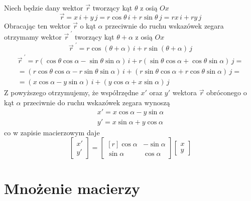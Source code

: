 \documentclass[12pt,a4paper,leqno]{article}
\numberwithin{equation}{section}
\begin{document}
Niech będzie dany wektor $\vec{r}$ tworzący kąt $\theta$ z osią $Ox$
\begin{equation}
\vec{r} = x \, i + y \, j = r \cos \theta \, i + r \sin \theta \, j = r x \, i + r y \, j
\end{equation}
Obracając ten wektor $\vec{r}$ o kąt $\alpha$ przeciwnie do ruchu wskazówek zegara
otrzymamy wektor $\vec{r}^{\,\,'}$ tworzący kąt $\theta + \alpha$ z osią $Ox$
\begin{equation}
\vec{r}^{\,\,'} = r \cos( \theta + \alpha ) \, i + r \sin( \theta + \alpha ) \, j
\end{equation}
\begin{eqnarray}
\vec{r}^{\,\,'} = r (\cos \theta \cos \alpha - \sin \theta \sin \alpha) \, i
+                 r (\sin \theta \cos \alpha + \cos \theta \sin \alpha) \, j         =  \\ \nonumber
=
( r \cos \theta \cos \alpha - r \sin \theta \sin \alpha ) \, i 
+
( r \sin \theta \cos \alpha + r \cos \theta \sin \alpha ) \, j                       =  \\ \nonumber
=
( x \cos \alpha - y \sin \alpha ) \, i 
+
( y \cos \alpha + x \sin \alpha ) \, j 
\end{eqnarray}
Z powyższego otrzymujemy, że współrzędne $x'$ oraz $y'$ wektora $\vec{r}$ obróconego o kąt $\alpha$ przeciwnie 
do ruchu wskazówek zegara wynoszą
\begin{eqnarray}
x' = x \cos \alpha - y \sin \alpha      \\ 
y' = x \sin \alpha + y \cos \alpha
\end{eqnarray}
co w zapisie macierzowym daje
\begin{equation}
\begin{bmatrix}
x' \\ 
y' 
\end{bmatrix}
=
\begin{bmatrix*}[r]
 \cos \alpha  & -\sin \alpha  \\
 \sin \alpha  &  \cos \alpha
\end{bmatrix*}
\begin{bmatrix}
x \\ 
y 
\end{bmatrix}
\end{equation}



\section{Mnożenie macierzy}\label{sec3}
\end{document}
